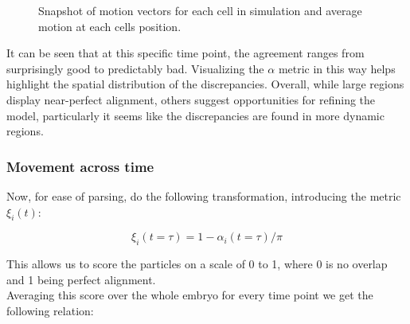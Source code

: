 \begin{figure}[H]
    \centering
    \caption{Snapshot of motion vectors for each cell in simulation and average motion at each cells position. }
    \label{fig:motionAgreementExample}
\end{figure}


It can be seen that at this specific time point, the agreement ranges from surprisingly good to predictably bad. Visualizing the $\alpha$ metric in this way helps highlight the spatial distribution of the discrepancies. Overall, while large regions display near-perfect alignment, others suggest opportunities for refining the model, particularly it seems like the discrepancies are found in more dynamic regions.\\

\subsubsection{Movement across time}

Now, for ease of parsing, do the following transformation, introducing the metric $\xi_i(t)$:

\begin{equation}
    \xi_i(t=\tau) = 1-\alpha_i(t=\tau)/\pi
\end{equation}

This allows us to score the particles on a scale of 0 to 1, where 0 is no overlap and 1 being perfect alignment.\\

Averaging this score over the whole embryo for every time point we get the following relation:

